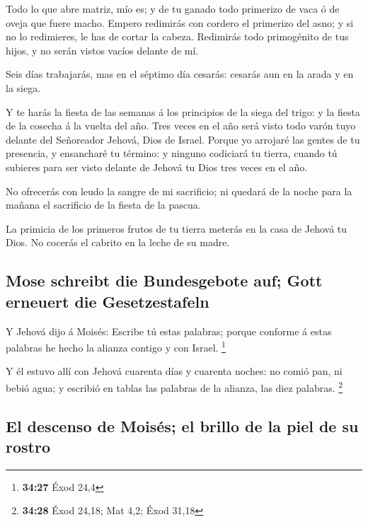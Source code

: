  Todo lo que abre matriz, mío es; y de tu ganado todo
primerizo de vaca ó de oveja que fuere macho.  Empero
redimirás con cordero el primerizo del asno; y si no lo redimieres, le
has de cortar la cabeza. Redimirás todo primogénito de tus hijos, y no
serán vistos vacíos delante de mí.

 Seis días trabajarás, mas en el séptimo día cesarás:
cesarás aun en la arada y en la siega.

 Y te harás la fiesta de las semanas á los principios de
la siega del trigo: y la fiesta de la cosecha á la vuelta del año.
 Tres veces en el año será visto todo varón tuyo delante
del Señoreador Jehová, Dios de Israel.  Porque yo
arrojaré las gentes de tu presencia, y ensancharé tu término: y ninguno
codiciará tu tierra, cuando tú subieres para ser visto delante de Jehová
tu Dios tres veces en el año.

 No ofrecerás con leudo la sangre de mi sacrificio; ni
quedará de la noche para la mañana el sacrificio de la fiesta de la
pascua.

 La primicia de los primeros frutos de tu tierra meterás
en la casa de Jehová tu Dios. No cocerás el cabrito en la leche de su
madre.

\hypertarget{mose-schreibt-die-bundesgebote-auf-gott-erneuert-die-gesetzestafeln}{%
\subsection{Mose schreibt die Bundesgebote auf; Gott erneuert die
Gesetzestafeln}\label{mose-schreibt-die-bundesgebote-auf-gott-erneuert-die-gesetzestafeln}}

 Y Jehová dijo á Moisés: Escribe tú estas palabras;
porque conforme á estas palabras he hecho la alianza contigo y con
Israel. \footnote{\textbf{34:27} Éxod 24,4}

 Y él estuvo allí con Jehová cuarenta días y cuarenta
noches: no comió pan, ni bebió agua; y escribió en tablas las palabras
de la alianza, las diez palabras. \footnote{\textbf{34:28} Éxod 24,18;
  Mat 4,2; Éxod 31,18}

\hypertarget{el-descenso-de-moisuxe9s-el-brillo-de-la-piel-de-su-rostro}{%
\subsection{El descenso de Moisés; el brillo de la piel de su
rostro}\label{el-descenso-de-moisuxe9s-el-brillo-de-la-piel-de-su-rostro}}

